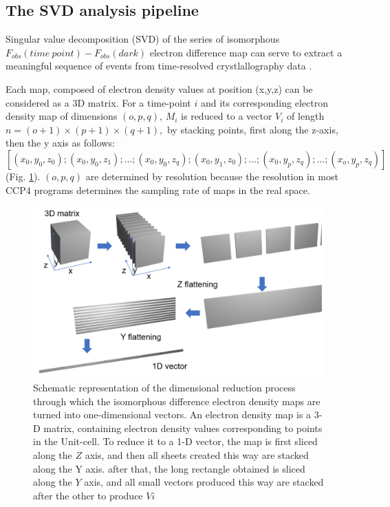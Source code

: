 \subsection{The SVD analysis pipeline}\label{sec:SVD_Methods}
Singular value decomposition (SVD) of the series of isomorphous  \(F_{obs}(time\ point) - F_{obs}(dark)\) electron difference map  can serve to extract a meaningful sequence of events from time-resolved crystlallography data \parencite{schmidtApplicationSingularValue2003,rajagopalAnalysisExperimentalTimeresolved2004} . 

Each map, composed of electron density values at position (x,y,z) can be considered as a 3D matrix. For a time-point \(i\) and its corresponding electron density map of dimensions \((o,p,q)\), \(M_{i}\) is reduced to a vector \(V_i\) of length \(n = (o+1)\times(p+1)\times(q+1), \) by stacking points, first along the z-axis, then the y axis as follows: \[[(x_0,y_0,z_0);(x_0,y_0,z_1);...;(x_0,y_0,z_q); (x_0,y_1,z_0);...;(x_0,y_p,z_q);...;(x_o,y_p,z_q)]\] (Fig. \ref{fig:SVD_dimensional reduction}). \((o,p,q)\) are determined by resolution because the resolution in most CCP4 programs determines the sampling rate of maps in the real space. 

\begin{figure}[H]
  \centering
  \includegraphics[width=\textwidth]{images/cracry/SVD_flattening.pdf}
  \hfill
  \caption{Schematic representation of the dimensional reduction process through which the isomorphous difference electron density maps are turned into one-dimensional vectors. An electron density map is a 3-D matrix, containing electron density values corresponding to points in the Unit-cell. To reduce it to a 1-D vector, the map is first sliced along the \(Z\) axis, and then all sheets created this way are stacked along the Y axis. after that, the long rectangle obtained is sliced along the \(Y\) axis, and all small vectors produced this way are stacked after the other to produce \(Vi\)}\label{fig:SVD_dimensional reduction}
\end{figure}



